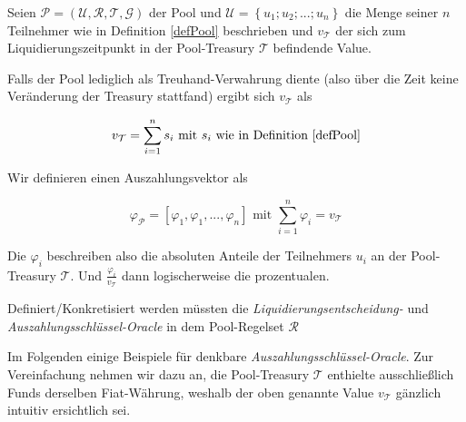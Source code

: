 \begin{Def}
\label{defPayoutOracle}

Seien $\mathcal{P} = \left( \mathcal{U}, \mathcal{R}, \mathcal{T}, \mathcal{G} \right)$ 
der Pool und $\mathcal{U} = \left\{ u_1; u_2;...;u_n \right\}$ die Menge seiner $n$ Teilnehmer wie in Definition \ref{defPool} beschrieben und $v_{\mathcal{T}}$ der sich zum Liquidierungszeitpunkt in der Pool-Treasury $\mathcal{T}$ befindende Value. 

Falls der Pool lediglich als Treuhand-Verwahrung diente (also über die Zeit keine Veränderung der Treasury stattfand) ergibt sich $v_{\mathcal{T}}$ als  

\vspace{0.1cm}

\begin{equation*}
  v_{\mathcal{T}} = \sum_{i=1}^{n} s_i \text{ mit } s_i \text{ wie in Definition \ref{defPool}}
\end{equation*}

\vspace{0.2cm}

Wir definieren einen Auszahlungsvektor als

\begin{equation*}
  \varphi_{\mathcal{P}} = [\varphi_1, \varphi_1, ..., \varphi_n] \text{ mit } \sum_{i=1}^{n} \varphi_i = v_{\mathcal{T}} 
\end{equation*}

\vspace{0.2cm}

Die $\varphi_i$ beschreiben also die absoluten Anteile der Teilnehmers $u_i$ an der Pool-Treasury $\mathcal{T}$. Und $\frac{\varphi_i}{v_{\mathcal{T}}}$ dann logischerweise die prozentualen.

\end{Def}


Definiert/Konkretisiert werden müssten die \textit{Liquidierungsentscheidung-} und \textit{Auszahl\-ungsschlüssel-Oracle} in dem Pool-Regelset $\mathcal{R}$

\vspace{0.3cm}

Im Folgenden einige Beispiele für denkbare \textit{Auszahlungsschlüssel-Oracle}. Zur Vereinfachung nehmen wir dazu an, die Pool-Treasury $\mathcal{T}$ enthielte ausschließlich Funds derselben Fiat-Währung, weshalb
der oben genannte Value $v_{\mathcal{T}}$ gänzlich intuitiv ersichtlich sei.  


\vspace{0.3cm}

